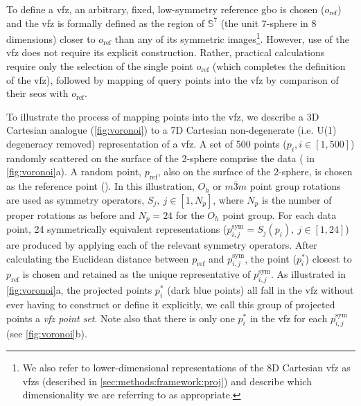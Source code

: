 \documentclass[final,twocolumn,12pt]{elsarticle}
\begin{document}
To define a \gls{vfz}, an arbitrary, fixed, low-symmetry reference \gls{gbo} is chosen ($o_{\text{ref}}$) and the \gls{vfz} is formally defined as the region of $\mathbb{S}^7$ (the unit 7-sphere in 8 dimensions) closer to $o_{\text{ref}}$ than any of its symmetric images\footnote{We also refer to lower-dimensional representations of the 8D Cartesian \gls{vfz} as \glspl{vfz} (described in \cref{sec:methods:framework:proj}) and describe which dimensionality we are referring to as appropriate. }. However, use of the \gls{vfz} does not require its explicit construction. Rather, practical calculations require only the selection of the single point $o_{\text{ref}}$ (which completes the definition of the \gls{vfz}), followed by mapping of query points into the \gls{vfz} by comparison of their \glspl{seo} with $o_{\text{ref}}$.

To illustrate the process of mapping points into the \gls{vfz}, we describe a 3D Cartesian analogue (\cref{fig:voronoi}) to a 7D Cartesian non-degenerate (i.e. U(1) degeneracy removed) representation of a \gls{vfz}. A set of \num{500} points ($p_i, i\in[1,500]$) randomly scattered on the surface of the 2-sphere comprise the data (\startpt{} in \cref{fig:voronoi}a). A random point, $p_{\text{ref}}$, also on the surface of the 2-sphere, is chosen as the reference point (). In this illustration, $O_h$ or $m\bar{3}m$ point group rotations are used as symmetry operators, $S_j,\ j\in[1,N_p]$, where $N_p$ is the number of proper rotations as before and $N_p = 24$ for the $O_h$  point group. For each data point, \num{24} symmetrically equivalent representations ($p^{\text{sym}}_{i,j} = S_j(p_i),\ j\in[1,24]$) are produced by applying each of the relevant symmetry operators. After calculating the Euclidean distance between $p_{\text{ref}}$ and $p^{\text{sym}}_{i,j}$, the point ($p^{*}_i$) closest to $p_{\text{ref}}$ is chosen and retained as the unique representative of $p^{\text{sym}}_{i,j}$. As illustrated in \cref{fig:voronoi}a, the projected points $p^{*}_i$ (dark blue points) all fall in the \gls{vfz} without ever having to construct or define it explicitly, we call this group of projected points a \textit{\gls{vfz} point set}. Note also that there is only one $p^{*}_i$ in the \gls{vfz} for each $p^{\text{sym}}_{i,j}$ (see \cref{fig:voronoi}b).
\end{document}
